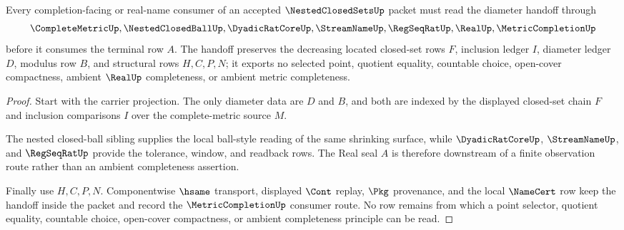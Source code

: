 \begin{theorem}
\label{thm:nested-closed-sets-diameter-handoff}
Every completion-facing or real-name consumer of an accepted $\NestedClosedSetsUp$ packet must read the diameter handoff through
$$
\CompleteMetricUp,\NestedClosedBallUp,\DyadicRatCoreUp,\StreamNameUp,\RegSeqRatUp,\RealUp,\MetricCompletionUp
$$
before it consumes the terminal row $A$. The handoff preserves the decreasing located closed-set rows $F$, inclusion ledger $I$, diameter ledger $D$, modulus row $B$, and structural rows $H,C,P,N$; it exports no selected point, quotient equality, countable choice, open-cover compactness, ambient $\RealUp$ completeness, or ambient metric completeness.
\end{theorem}
\begin{proof}
Start with the carrier projection. The only diameter data are $D$ and $B$, and both are indexed by the displayed closed-set chain $F$ and inclusion comparisons $I$ over the complete-metric source $M$.

The nested closed-ball sibling supplies the local ball-style reading of the same shrinking surface, while $\DyadicRatCoreUp$, $\StreamNameUp$, and $\RegSeqRatUp$ provide the tolerance, window, and readback rows. The Real seal $A$ is therefore downstream of a finite observation route rather than an ambient completeness assertion.

Finally use $H,C,P,N$. Componentwise $\hsame$ transport, displayed $\Cont$ replay, $\Pkg$ provenance, and the local $\NameCert$ row keep the handoff inside the packet and record the $\MetricCompletionUp$ consumer route. No row remains from which a point selector, quotient equality, countable choice, open-cover compactness, or ambient completeness principle can be read.
\end{proof}



